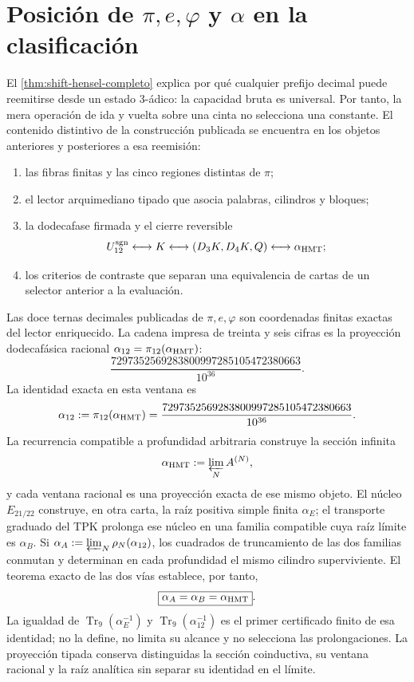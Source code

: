\section{Posición de \texorpdfstring{\(\pi,e,\varphi\) y \(\alpha\)}{pi, e, phi y alpha} en la clasificación}

El \cref{thm:shift-hensel-completo} explica por qué cualquier prefijo
decimal puede reemitirse desde un estado 3-ádico: la capacidad bruta es
universal. Por tanto, la mera operación de ida y vuelta sobre una cinta no selecciona una
constante. El contenido distintivo de la construcción publicada se encuentra
en los objetos anteriores y posteriores a esa reemisión:
\begin{enumerate}
\item las fibras finitas y las cinco regiones distintas de \(\pi\);
\item el lector arquimediano tipado que asocia palabras, cilindros y bloques;
\item la dodecafase firmada y el cierre reversible
\[
U_{12}^{\rm sgn}
\longleftrightarrow K
\longleftrightarrow(D_3K,D_4K,Q)
\longleftrightarrow\alpha_{\rm HMT};
\]
\item los criterios de contraste que separan una equivalencia de cartas de un
selector anterior a la evaluación.
\end{enumerate}

Las doce ternas decimales publicadas de \(\pi,e,\varphi\) son coordenadas
finitas exactas del lector enriquecido. La cadena impresa de treinta y seis
cifras es la proyección dodecafásica racional
\(\alpha_{12}=\pi_{12}(\alpha_{\rm HMT})\):
\[
\frac{7297352569283800997285105472380663}{10^{36}}.
\]
La identidad exacta en esta ventana es
\[
\alpha_{12}
:=\pi_{12}(\alpha_{\rm HMT})
=\frac{7297352569283800997285105472380663}{10^{36}}.
\]
La recurrencia compatible a profundidad arbitraria construye la sección
infinita
\[
 \alpha_{\rm HMT}:=\varprojlim_N A^{(N)},
\]
y cada ventana racional es una proyección exacta de ese mismo objeto. El
núcleo \(E_{21/22}\) construye, en otra carta, la raíz positiva simple
finita \(\alpha_E\); el transporte graduado del TPK prolonga ese núcleo en
una familia compatible cuya raíz límite es \(\alpha_B\). Si
\(\alpha_A:=\varprojlim_N\rho_N(\alpha_{12})\), los cuadrados de truncamiento
de las dos familias conmutan y determinan en cada profundidad el mismo
cilindro superviviente. El teorema exacto de las dos vías establece, por
tanto,
\[
 \boxed{\alpha_A=\alpha_B=\alpha_{\rm HMT}}.
\]
La igualdad de \(\operatorname{Tr}_9(\alpha_E^{-1})\) y
\(\operatorname{Tr}_9(\alpha_{12}^{-1})\) es el primer certificado finito de
esa identidad; no la define, no limita su alcance y no selecciona las
prolongaciones. La proyección tipada conserva distinguidas la sección
coinductiva, su ventana racional y la raíz analítica sin separar su identidad
en el límite.

